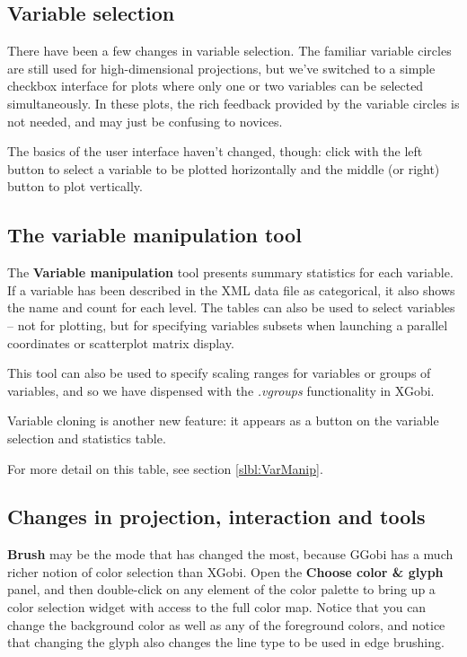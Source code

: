 \documentclass[11pt]{article}
\def\Widget#1{\textbf{#1}}
\begin{document}
{\subsection {Variable selection}

There have been a few changes in variable selection.  The familiar
variable circles are still used for high-dimensional projections, but
we've switched to a simple checkbox interface for plots where only one
or two variables can be selected simultaneously.  In these plots, the
rich feedback provided by the variable circles is not needed, and may
just be confusing to novices.

The basics of the user interface haven't changed, though:
click with the left button to select a variable to be plotted
horizontally and the middle (or right) button to plot vertically.

\subsection {The variable manipulation tool}

The \Widget{Variable manipulation} tool presents summary statistics for
each variable.  If a variable has been described in the XML data file
as categorical, it also shows the name and count for each level.
The tables can also be used to select variables -- not for plotting, but
for specifying variables subsets when launching a parallel coordinates
or scatterplot matrix display.

This tool can also be used to specify scaling ranges for variables or
groups of variables, and so we have dispensed with the {\em .vgroups}
functionality in XGobi.

Variable cloning is another new feature: it appears as a button
on the variable selection and statistics table.

For more detail on this table, see section \ref{slbl:VarManip}.

\subsection{Changes in projection, interaction and tools}

\Widget{Brush} may be the mode that has changed the most,
because GGobi has a much richer notion of color selection than
XGobi.  Open the \Widget{Choose color \& glyph} panel, and then
double-click on any element of the color palette to bring up a color
selection widget with access to the full color map.  Notice that you
can change the background color as well as any of the foreground
colors, and notice that changing the glyph also changes the line
type to be used in edge brushing.

}
\end{document}
